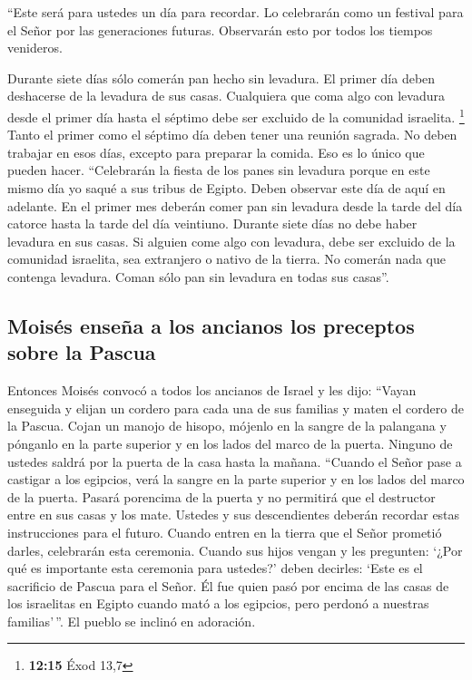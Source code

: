  ``Este será para ustedes un día para recordar. Lo
celebrarán como un festival para el Señor por las generaciones futuras.
Observarán esto por todos los tiempos venideros.

 Durante siete días sólo comerán pan hecho sin levadura.
El primer día deben deshacerse de la levadura de sus casas. Cualquiera
que coma algo con levadura desde el primer día hasta el séptimo debe ser
excluido de la comunidad israelita. \footnote{\textbf{12:15} Éxod 13,7}
 Tanto el primer como el séptimo día deben tener una
reunión sagrada. No deben trabajar en esos días, excepto para preparar
la comida. Eso es lo único que pueden hacer. 
``Celebrarán la fiesta de los panes sin levadura porque en este mismo
día yo saqué a sus tribus de Egipto. Deben observar este día de aquí en
adelante.  En el primer mes deberán comer pan sin
levadura desde la tarde del día catorce hasta la tarde del día
veintiuno.  Durante siete días no debe haber levadura en
sus casas. Si alguien come algo con levadura, debe ser excluido de la
comunidad israelita, sea extranjero o nativo de la tierra.
 No comerán nada que contenga levadura. Coman sólo pan
sin levadura en todas sus casas''.

\hypertarget{moisuxe9s-enseuxf1a-a-los-ancianos-los-preceptos-sobre-la-pascua}{%
\subsection{Moisés enseña a los ancianos los preceptos sobre la
Pascua}\label{moisuxe9s-enseuxf1a-a-los-ancianos-los-preceptos-sobre-la-pascua}}

 Entonces Moisés convocó a todos los ancianos de Israel y
les dijo: ``Vayan enseguida y elijan un cordero para cada una de sus
familias y maten el cordero de la Pascua.  Cojan un
manojo de hisopo, mójenlo en la sangre de la palangana y pónganlo en la
parte superior y en los lados del marco de la puerta. Ninguno de ustedes
saldrá por la puerta de la casa hasta la mañana. 
``Cuando el Señor pase a castigar a los egipcios, verá la sangre en la
parte superior y en los lados del marco de la puerta. Pasará porencima
de la puerta y no permitirá que el destructor entre en sus casas y los
mate.  Ustedes y sus descendientes deberán recordar estas
instrucciones para el futuro.  Cuando entren en la tierra
que el Señor prometió darles, celebrarán esta ceremonia. 
Cuando sus hijos vengan y les pregunten: `¿Por qué es importante esta
ceremonia para ustedes?'  deben decirles: `Este es el
sacrificio de Pascua para el Señor. Él fue quien pasó por encima de las
casas de los israelitas en Egipto cuando mató a los egipcios, pero
perdonó a nuestras familias'\,''. El pueblo se inclinó en adoración.


